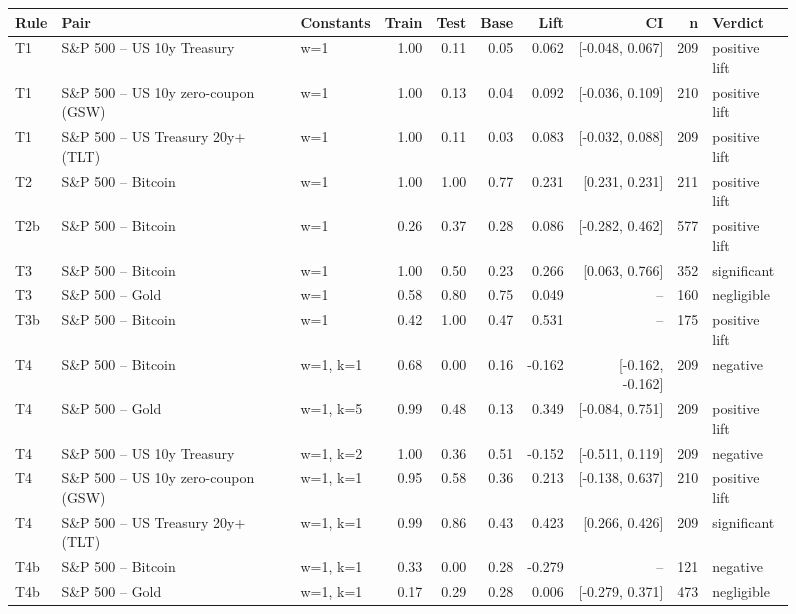 \begin{figure}
\centering
\begin{tabular}{lllrrrrrrl}
\toprule
Rule & Pair & Constants & Train & Test & Base & Lift & CI & n & Verdict \\
\midrule
T1 & S\&P 500 -- US 10y Treasury & w=1 & 1.00 & 0.11 & 0.05 & 0.062 & [-0.048, 0.067] & 209 & positive lift \\
T1 & S\&P 500 -- US 10y zero-coupon (GSW) & w=1 & 1.00 & 0.13 & 0.04 & 0.092 & [-0.036, 0.109] & 210 & positive lift \\
T1 & S\&P 500 -- US Treasury 20y+ (TLT) & w=1 & 1.00 & 0.11 & 0.03 & 0.083 & [-0.032, 0.088] & 209 & positive lift \\
T2 & S\&P 500 -- Bitcoin & w=1 & 1.00 & 1.00 & 0.77 & 0.231 & [0.231, 0.231] & 211 & positive lift \\
T2b & S\&P 500 -- Bitcoin & w=1 & 0.26 & 0.37 & 0.28 & 0.086 & [-0.282, 0.462] & 577 & positive lift \\
T3 & S\&P 500 -- Bitcoin & w=1 & 1.00 & 0.50 & 0.23 & 0.266 & [0.063, 0.766] & 352 & significant \\
T3 & S\&P 500 -- Gold & w=1 & 0.58 & 0.80 & 0.75 & 0.049 & -- & 160 & negligible \\
T3b & S\&P 500 -- Bitcoin & w=1 & 0.42 & 1.00 & 0.47 & 0.531 & -- & 175 & positive lift \\
T4 & S\&P 500 -- Bitcoin & w=1, k=1 & 0.68 & 0.00 & 0.16 & -0.162 & [-0.162, -0.162] & 209 & negative \\
T4 & S\&P 500 -- Gold & w=1, k=5 & 0.99 & 0.48 & 0.13 & 0.349 & [-0.084, 0.751] & 209 & positive lift \\
T4 & S\&P 500 -- US 10y Treasury & w=1, k=2 & 1.00 & 0.36 & 0.51 & -0.152 & [-0.511, 0.119] & 209 & negative \\
T4 & S\&P 500 -- US 10y zero-coupon (GSW) & w=1, k=1 & 0.95 & 0.58 & 0.36 & 0.213 & [-0.138, 0.637] & 210 & positive lift \\
T4 & S\&P 500 -- US Treasury 20y+ (TLT) & w=1, k=1 & 0.99 & 0.86 & 0.43 & 0.423 & [0.266, 0.426] & 209 & significant \\
T4b & S\&P 500 -- Bitcoin & w=1, k=1 & 0.33 & 0.00 & 0.28 & -0.279 & -- & 121 & negative \\
T4b & S\&P 500 -- Gold & w=1, k=1 & 0.17 & 0.29 & 0.28 & 0.006 & [-0.279, 0.371] & 473 & negligible \\

\end{tabular}
\end{figure}

